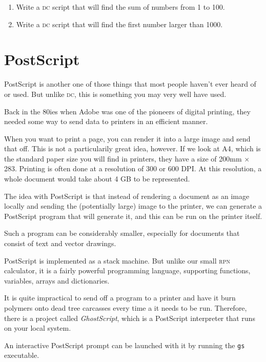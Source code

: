 \documentclass[a4paper,twocolumn]{article}
\begin{document}
\begin{enumerate}
  \item Write a \textsc{dc} script that will find the sum of numbers from 1 to 100.
  \item Write a \textsc{dc} script that will find the first number larger than 1000.
\end{enumerate}

\section{PostScript}

PostScript is another one of those things that most people haven't ever heard of or used. But unlike \textsc{dc}, this is something you may very well have used.

Back in the 80ies when Adobe was one of the pioneers of digital printing, they needed some way to send data to printers in an efficient manner.

When you want to print a page, you can render it into a large image and send that off. This is not a particularily great idea, however. If we look at A4, which is the standard paper size you will find in printers, they have a size of 200mm $\times$ 283. Printing is often done at a resolution of 300 or 600 DPI. At this resolution, a whole document would take about 4 GB to be represented.

The idea with PostScript is that instead of rendering a document as an image locally and sending the (potentially large) image to the printer, we can generate a PostScript program that will generate it, and this can be run on the printer itself.

Such a program can be considerably smaller, especially for documents that consist of text and vector drawings.

PostScript is implemented as a stack machine. But unlike our small \textsc{rpn} calculator, it is a fairly powerful programming language, supporting functions, variables, arrays and dictionaries.

It is quite impractical to send off a program to a printer and have it burn polymers onto dead tree carcasses every time a it needs to be run. Therefore, there is a project called \emph{GhostScript}, which is a PostScript interpreter that runs on your local system.

An interactive PostScript prompt can be launched with it by running the \verb|gs| executable.\cite{bluebook}
\end{document}
